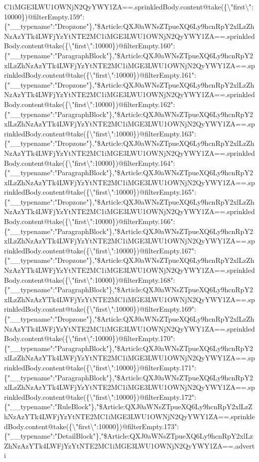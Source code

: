 C1iMGE3LWU1OWNjN2QyYWY1ZA==.sprinkledBody.content@take(\{\textbackslash{}"first\textbackslash{}":10000\})@filterEmpty.159":\{"\_\_typename":"Dropzone"\},"\$Article:QXJ0aWNsZTpueXQ6Ly9hcnRpY2xlLzZhNzAzYTk4LWFjYzYtNTE2MC1iMGE3LWU1OWNjN2QyYWY1ZA==.sprinkledBody.content@take(\{\textbackslash{}"first\textbackslash{}":10000\})@filterEmpty.160":\{"\_\_typename":"ParagraphBlock"\},"\$Article:QXJ0aWNsZTpueXQ6Ly9hcnRpY2xlLzZhNzAzYTk4LWFjYzYtNTE2MC1iMGE3LWU1OWNjN2QyYWY1ZA==.sprinkledBody.content@take(\{\textbackslash{}"first\textbackslash{}":10000\})@filterEmpty.161":\{"\_\_typename":"Dropzone"\},"\$Article:QXJ0aWNsZTpueXQ6Ly9hcnRpY2xlLzZhNzAzYTk4LWFjYzYtNTE2MC1iMGE3LWU1OWNjN2QyYWY1ZA==.sprinkledBody.content@take(\{\textbackslash{}"first\textbackslash{}":10000\})@filterEmpty.162":\{"\_\_typename":"ParagraphBlock"\},"\$Article:QXJ0aWNsZTpueXQ6Ly9hcnRpY2xlLzZhNzAzYTk4LWFjYzYtNTE2MC1iMGE3LWU1OWNjN2QyYWY1ZA==.sprinkledBody.content@take(\{\textbackslash{}"first\textbackslash{}":10000\})@filterEmpty.163":\{"\_\_typename":"Dropzone"\},"\$Article:QXJ0aWNsZTpueXQ6Ly9hcnRpY2xlLzZhNzAzYTk4LWFjYzYtNTE2MC1iMGE3LWU1OWNjN2QyYWY1ZA==.sprinkledBody.content@take(\{\textbackslash{}"first\textbackslash{}":10000\})@filterEmpty.164":\{"\_\_typename":"ParagraphBlock"\},"\$Article:QXJ0aWNsZTpueXQ6Ly9hcnRpY2xlLzZhNzAzYTk4LWFjYzYtNTE2MC1iMGE3LWU1OWNjN2QyYWY1ZA==.sprinkledBody.content@take(\{\textbackslash{}"first\textbackslash{}":10000\})@filterEmpty.165":\{"\_\_typename":"Dropzone"\},"\$Article:QXJ0aWNsZTpueXQ6Ly9hcnRpY2xlLzZhNzAzYTk4LWFjYzYtNTE2MC1iMGE3LWU1OWNjN2QyYWY1ZA==.sprinkledBody.content@take(\{\textbackslash{}"first\textbackslash{}":10000\})@filterEmpty.166":\{"\_\_typename":"ParagraphBlock"\},"\$Article:QXJ0aWNsZTpueXQ6Ly9hcnRpY2xlLzZhNzAzYTk4LWFjYzYtNTE2MC1iMGE3LWU1OWNjN2QyYWY1ZA==.sprinkledBody.content@take(\{\textbackslash{}"first\textbackslash{}":10000\})@filterEmpty.167":\{"\_\_typename":"Dropzone"\},"\$Article:QXJ0aWNsZTpueXQ6Ly9hcnRpY2xlLzZhNzAzYTk4LWFjYzYtNTE2MC1iMGE3LWU1OWNjN2QyYWY1ZA==.sprinkledBody.content@take(\{\textbackslash{}"first\textbackslash{}":10000\})@filterEmpty.168":\{"\_\_typename":"ParagraphBlock"\},"\$Article:QXJ0aWNsZTpueXQ6Ly9hcnRpY2xlLzZhNzAzYTk4LWFjYzYtNTE2MC1iMGE3LWU1OWNjN2QyYWY1ZA==.sprinkledBody.content@take(\{\textbackslash{}"first\textbackslash{}":10000\})@filterEmpty.169":\{"\_\_typename":"Dropzone"\},"\$Article:QXJ0aWNsZTpueXQ6Ly9hcnRpY2xlLzZhNzAzYTk4LWFjYzYtNTE2MC1iMGE3LWU1OWNjN2QyYWY1ZA==.sprinkledBody.content@take(\{\textbackslash{}"first\textbackslash{}":10000\})@filterEmpty.170":\{"\_\_typename":"ParagraphBlock"\},"\$Article:QXJ0aWNsZTpueXQ6Ly9hcnRpY2xlLzZhNzAzYTk4LWFjYzYtNTE2MC1iMGE3LWU1OWNjN2QyYWY1ZA==.sprinkledBody.content@take(\{\textbackslash{}"first\textbackslash{}":10000\})@filterEmpty.171":\{"\_\_typename":"ParagraphBlock"\},"\$Article:QXJ0aWNsZTpueXQ6Ly9hcnRpY2xlLzZhNzAzYTk4LWFjYzYtNTE2MC1iMGE3LWU1OWNjN2QyYWY1ZA==.sprinkledBody.content@take(\{\textbackslash{}"first\textbackslash{}":10000\})@filterEmpty.172":\{"\_\_typename":"RuleBlock"\},"\$Article:QXJ0aWNsZTpueXQ6Ly9hcnRpY2xlLzZhNzAzYTk4LWFjYzYtNTE2MC1iMGE3LWU1OWNjN2QyYWY1ZA==.sprinkledBody.content@take(\{\textbackslash{}"first\textbackslash{}":10000\})@filterEmpty.173":\{"\_\_typename":"DetailBlock"\},"\$Article:QXJ0aWNsZTpueXQ6Ly9hcnRpY2xlLzZhNzAzYTk4LWFjYzYtNTE2MC1iMGE3LWU1OWNjN2QyYWY1ZA==.adverti